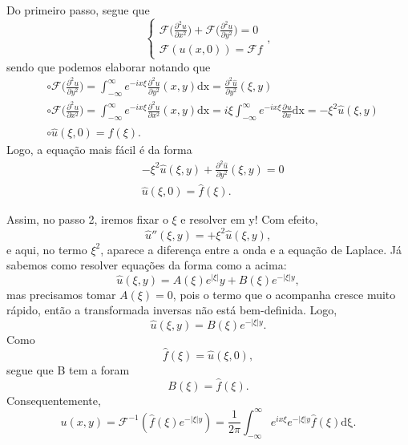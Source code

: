 \documentclass[../pde_notes.tex]{subfiles}
\begin{document}
Do primeiro passo, segue que
\[
	\left\{\begin{array}{ll}
		\mathcal{F}\biggl(\frac{\partial^{2}u}{\partial x^{2}}\biggr) + \mathcal{F}\biggl(\frac{\partial^{2}u}{\partial y^{2}}\biggr) = 0 \\
		\mathcal{F}(u(x, 0)) = \mathcal{F}f
	\end{array}\right.,
\]
sendo que podemos elaborar notando que
\begin{align*}
	 & \circ \mathcal{F}\biggl(\frac{\partial^{2}u}{\partial y^{2}}\biggr) = \int_{-\infty}^{\infty}e^{-ix\xi }\frac{\partial^{2}u}{\partial y^{2}}(x, y) \mathrm{dx} = \frac{\partial^{2}\hat{u}}{\partial y^{2}}(\xi , y)                                                              \\
	 & \circ \mathcal{F}\biggl(\frac{\partial^{2}u}{\partial x^{2}}\biggr) = \int_{-\infty}^{\infty}e^{-ix\xi }\frac{\partial^{2}u}{\partial x^{2}}(x, y) \mathrm{dx} = i\xi \int_{-\infty}^{\infty}e^{-ix\xi }\frac{\partial^{}u}{\partial x^{}} \mathrm{dx} = -\xi^{2}\hat{u}(\xi , y) \\
	 & \circ \hat{u}(\xi, 0) = \hat{f}(\xi ).
\end{align*}
Logo, a equação mais fácil é da forma
\begin{align*}
	 & -\xi^{2}\hat{u}(\xi , y) + \frac{\partial^{2}\hat{u}}{\partial y^{2}}(\xi , y) = 0 \\
	 & \hat{u}(\xi , 0) = \hat{f}(\xi ).
\end{align*}

Assim, no passo 2, iremos fixar o \(\xi \) e resolver em y! Com efeito,
\[
	\hat{u}''(\xi , y) = + \xi^{2}\hat{u}(\xi ,y),
\]
e aqui, no termo \(\xi^{2}\), aparece a diferença entre a onda e a equação de Laplace. Já sabemos como resolver equações da forma como a acima:
\[
	\hat{u}(\xi , y) = A(\xi )e^{|\xi |}y + B(\xi ) e^{-|\xi |y},
\]
mas precisamos tomar \(A(\xi ) = 0\), pois o termo que o acompanha cresce muito rápido, então a transformada inversas não está bem-definida. Logo,
\[
	\hat{u}(\xi , y) = B(\xi )e^{-|\xi |y}.
\]
Como
\[
	\hat{f}(\xi ) = \hat{u}(\xi , 0),
\]
segue que B tem a foram
\[
	B(\xi ) = \hat{f}(\xi ).
\]
Consequentemente,
\[
	u(x, y) = \mathcal{F}^{-1}(\hat{f}(\xi )e^{-|\xi |y}) = \frac{1}{2\pi }\int_{-\infty}^{\infty}e^{ix\xi }e^{-|\xi |y}\hat{f}(\xi ) \mathrm{d\xi }.
\]
\end{document}
